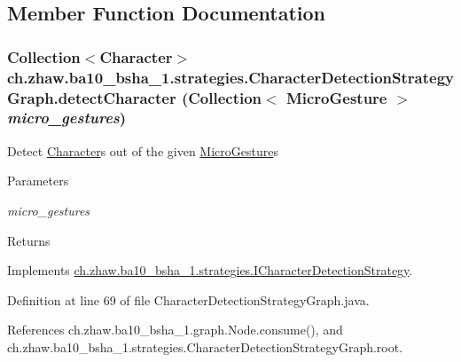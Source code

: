 \subsection{Member Function Documentation}
\hypertarget{classch_1_1zhaw_1_1ba10__bsha__1_1_1strategies_1_1CharacterDetectionStrategyGraph_af5d1202b6a9878b247cf4c5176102dd5}{
\subsubsection[{detectCharacter}]{\setlength{\rightskip}{0pt plus 5cm}Collection$<${\bf Character}$>$ ch.zhaw.ba10\_\-bsha\_\-1.strategies.CharacterDetectionStrategyGraph.detectCharacter (Collection$<$ {\bf MicroGesture} $>$ {\em micro\_\-gestures})}}
\label{classch_1_1zhaw_1_1ba10__bsha__1_1_1strategies_1_1CharacterDetectionStrategyGraph_af5d1202b6a9878b247cf4c5176102dd5}
Detect \hyperlink{classch_1_1zhaw_1_1ba10__bsha__1_1_1Character}{Character}s out of the given \hyperlink{}{MicroGesture}s


\begin{DoxyParams}{Parameters}
\item[{\em micro\_\-gestures}]\end{DoxyParams}
\begin{DoxyReturn}{Returns}

\end{DoxyReturn}


Implements \hyperlink{interfacech_1_1zhaw_1_1ba10__bsha__1_1_1strategies_1_1ICharacterDetectionStrategy_a994429a274e75c471d18aca69dce2c1d}{ch.zhaw.ba10\_\-bsha\_\-1.strategies.ICharacterDetectionStrategy}.

Definition at line 69 of file CharacterDetectionStrategyGraph.java.

References ch.zhaw.ba10\_\-bsha\_\-1.graph.Node.consume(), and ch.zhaw.ba10\_\-bsha\_\-1.strategies.CharacterDetectionStrategyGraph.root.

